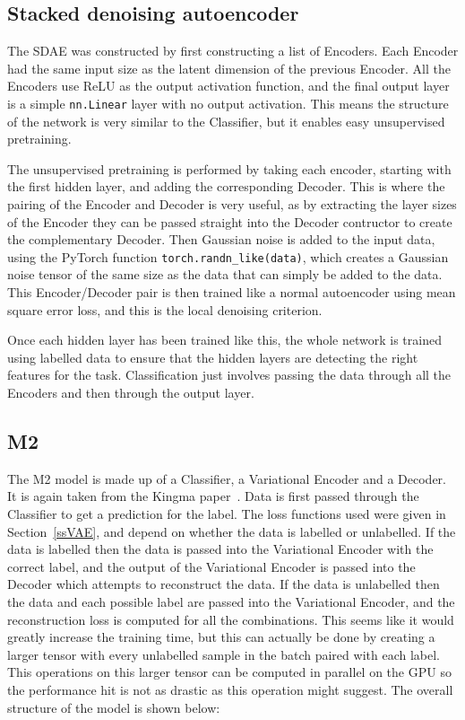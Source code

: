 \documentclass[12pt,a4paper,twoside,openright]{report}
\begin{document}
\subsection{Stacked denoising autoencoder}
The SDAE was constructed by first constructing a list of Encoders. Each Encoder had the same input size as the latent dimension of the 
previous Encoder. All the Encoders use ReLU as the output activation function, and the final output layer is a simple \texttt{nn.Linear} layer with 
no output activation. This means the structure of the network is very similar to the Classifier, but it enables easy unsupervised pretraining.

The unsupervised pretraining is performed by taking each encoder, starting with the first hidden layer, and adding the corresponding 
Decoder. This is where the pairing of the Encoder and Decoder is very useful, as by extracting the layer sizes of the Encoder they 
can be passed straight into the Decoder contructor to create the complementary Decoder. Then Gaussian noise is added to the input data,
using the PyTorch function \texttt{torch.randn\_like(data)}, which creates a Gaussian noise tensor of the same size as the data that can
simply be added to the data. This Encoder/Decoder pair is then trained like a normal autoencoder using mean square error loss, and 
this is the local denoising criterion.

Once each hidden layer has been trained like this, the whole network is trained using labelled data to ensure that the hidden layers 
are detecting the right features for the task. Classification just involves passing the data through all the Encoders and then through 
the output layer.

\subsection{M2}

The M2 model is made up of a Classifier, a Variational Encoder and a Decoder. It is again taken from the Kingma paper~\cite{DBLP:journals/corr/KingmaRMW14}.
Data is first passed through the Classifier to get a prediction for the label. The loss functions used were given in Section~\ref{ssVAE}, 
and depend on whether the data is labelled or unlabelled. If the data is labelled then the data is passed into the Variational Encoder 
with the correct label, and the output of the Variational Encoder is passed into the Decoder which attempts to reconstruct the data.
If the data is unlabelled then the data and each possible label are passed into the Variational Encoder, and the reconstruction loss 
is computed for all the combinations. This seems like it would greatly increase the training time, but this can actually be done 
by creating a larger tensor with every unlabelled sample in the batch paired with each label. This operations on this larger tensor 
can be computed in parallel on the GPU so the performance hit is not as drastic as this operation might suggest. The overall 
structure of the model is shown below:
\end{document}
